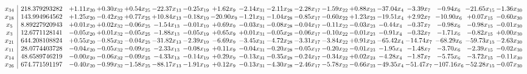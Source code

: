 \documentclass[9pt]{article}
\begin{document}
 \[\begin{array}{c| c c@{\hskip 2pt} c@{\hskip 2pt} c@{\hskip 2pt} c@{\hskip 2pt} c@{\hskip 2pt} c@{\hskip 2pt} c@{\hskip 2pt} c@{\hskip 2pt} c@{\hskip 2pt} c@{\hskip 2pt} c@{\hskip 2pt} c@{\hskip 2pt} c@{\hskip 2pt} c@{\hskip 2pt} c@{\hskip 2pt} c@{\hskip 2pt} }
 x_{34}   &  218.379293282 & +  1.11 x_{20} & +  0.30 x_{32} & +  0.54 x_{25} & -22.37 x_{13} & -0.25 x_{19} & +  1.62 x_{9} & -2.14 x_{31} & -2.11 x_{28} & -2.28 x_{17} & -1.59 x_{22} & +  0.88 x_{23} & -37.04 x_{4} & -3.39 x_{7} & -0.94 x_{6} & -21.65 x_{15} & -1.36 x_{30}\\
 x_{18}   &  143.994964562 & +  1.25 x_{20} & -0.42 x_{32} & +  0.77 x_{25} & + 10.84 x_{13} & -0.18 x_{19} & -20.90 x_{9} & -1.21 x_{31} & -1.04 x_{28} & -0.85 x_{17} & -0.60 x_{22} & +  1.23 x_{23} & -19.51 x_{4} & +  2.92 x_{7} & -10.90 x_{6} & +  0.07 x_{15} & -0.60 x_{30}\\
 x_{5}   &  8.89227920943 & +  0.01 x_{20} & +  0.02 x_{32} & -0.06 x_{25} & -1.54 x_{13} & -0.01 x_{19} & +  0.69 x_{9} & -0.03 x_{31} & -0.08 x_{28} & -0.04 x_{17} & -0.11 x_{22} & -0.03 x_{23} & -0.44 x_{4} & -0.37 x_{7} & -0.98 x_{6} & -0.98 x_{15} & -0.01 x_{30}\\
 x_{3}   &  12.6771128141 & -0.05 x_{20} & +  0.01 x_{32} & -0.05 x_{25} & -1.88 x_{13} & -0.05 x_{19} & +  0.65 x_{9} & +  0.01 x_{31} & -0.05 x_{28} & -0.06 x_{17} & -0.10 x_{22} & -0.01 x_{23} & -0.91 x_{4} & -0.32 x_{7} & -1.71 x_{6} & -0.82 x_{15} & +  0.00 x_{30}\\
 x_{21}   &  644.208108824 & +  0.55 x_{20} & -0.85 x_{32} & -0.04 x_{25} & -31.82 x_{13} & -2.39 x_{19} & -6.69 x_{9} & -3.45 x_{31} & -4.72 x_{28} & -3.31 x_{17} & -3.84 x_{22} & +  0.91 x_{23} & -65.42 x_{4} & -14.74 x_{7} & -68.29 x_{6} & -59.73 x_{15} & -2.63 x_{30}\\
 x_{11}   &  28.0774403728 & -0.04 x_{20} & -0.05 x_{32} & -0.09 x_{25} & -2.33 x_{13} & -0.08 x_{19} & +  0.11 x_{9} & -0.04 x_{31} & -0.20 x_{28} & -0.05 x_{17} & -0.20 x_{22} & -0.01 x_{23} & -1.95 x_{4} & -1.48 x_{7} & -3.70 x_{6} & -2.39 x_{15} & -0.02 x_{30}\\
 x_{14}   &  48.6589746219 & -0.00 x_{20} & -0.06 x_{32} & -0.09 x_{25} & -4.33 x_{13} & -0.14 x_{19} & +  0.29 x_{9} & -0.13 x_{31} & -0.35 x_{28} & -0.24 x_{17} & -0.34 x_{22} & +  0.02 x_{23} & -4.28 x_{4} & -1.87 x_{7} & -5.75 x_{6} & -3.72 x_{15} & -0.11 x_{30}\\
 x_{26}   &  674.771591197 & -0.40 x_{20} & -0.99 x_{32} & -1.58 x_{25} & -88.17 x_{13} & -1.91 x_{19} & +  0.12 x_{9} & -0.13 x_{31} & -4.30 x_{28} & -2.46 x_{17} & -5.78 x_{22} & -0.66 x_{23} & -49.35 x_{4} & -51.47 x_{7} & -107.16 x_{6} & -52.28 x_{15} & -0.07 x_{30}\\

\end{array}\]
\end{document}
